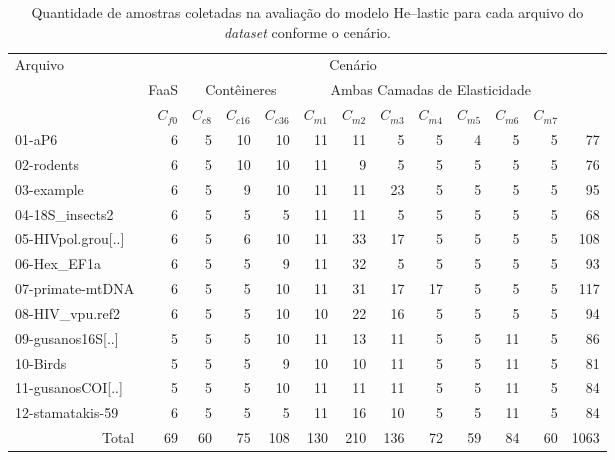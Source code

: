 \documentclass[english,brazilian]{UNISINOSmonografia} %
\newcommand\tabelaAngulo{90}
\begin{document}
\begin{table}[tbp]
	\centering%
	\begin{minipage}{\textwidth}
		\caption{Quantidade de amostras coletadas na avaliação do modelo \textsf{He}--lastic para cada arquivo do \textit{dataset} conforme o cenário.}
		\label{tab:results-modelo-samples}
		\vspace{1ex}
		\footnotesize
		\begin{tabular*}{\textwidth}{@{\extracolsep{\fill}}lrrrrrrrrrrrr@{}}
			\toprule
			\multirow[b]{3}{*}{Arquivo} & \multicolumn{11}{c}{Cenário} &
			\multirow[b]{3}{*}{\rotatebox[origin=c]{\tabelaAngulo}{\begin{tabular}[c]{@{}c@{}}Total\end{tabular}}} \\ \cmidrule(lr){2-12}
			& \multicolumn{1}{c}{FaaS} & \multicolumn{3}{c}{Contêineres} & \multicolumn{7}{c}{Ambas Camadas de Elasticidade} & \multicolumn{1}{c}{} \\ 
			\cmidrule(lr){2-2}
			\cmidrule(lr){3-5}
			\cmidrule(lr){6-12}
			& $C_{f0}$ & $C_{c8}$ & $C_{c16}$ & $C_{c36}$ & $C_{m1}$ & $C_{m2}$ & $C_{m3}$ & $C_{m4}$ & $C_{m5}$ & $C_{m6}$ & $C_{m7}$ & \multicolumn{1}{c}{} \\
			\midrule
			01-aP6 & 6 & 5 & 10 & 10 & 11 & 11 & 5 & 5 & 4 & 5 & 5 & 77 \\
			02-rodents & 6 & 5 & 10 & 10 & 11 & 9 & 5 & 5 & 5 & 5 & 5 & 76 \\
			03-example & 6 & 5 & 9 & 10 & 11 & 11 & 23 & 5 & 5 & 5 & 5 & 95 \\
			04-18S\_insects2 & 6 & 5 & 5 & 5 & 11 & 11 & 5 & 5 & 5 & 5 & 5 & 68 \\
			05-HIVpol.grou[..] & 6 & 5 & 6 & 10 & 11 & 33 & 17 & 5 & 5 & 5 & 5 & 108 \\
			06-Hex\_EF1a & 6 & 5 & 5 & 9 & 11 & 32 & 5 & 5 & 5 & 5 & 5 & 93 \\
			07-primate-mtDNA & 6 & 5 & 5 & 10 & 11 & 31 & 17 & 17 & 5 & 5 & 5 & 117 \\
			08-HIV\_vpu.ref2 & 6 & 5 & 5 & 10 & 10 & 22 & 16 & 5 & 5 & 5 & 5 & 94 \\
			09-gusanos16S[..] & 5 & 5 & 5 & 10 & 11 & 13 & 11 & 5 & 5 & 11 & 5 & 86 \\
			10-Birds & 5 & 5 & 5 & 9 & 10 & 10 & 11 & 5 & 5 & 11 & 5 & 81 \\
			11-gusanosCOI[..] & 5 & 5 & 5 & 10 & 11 & 11 & 11 & 5 & 5 & 11 & 5 & 84 \\
			12-stamatakis-59 & 6 & 5 & 5 & 5 & 11 & 16 & 10 & 5 & 5 & 11 & 5 & 84 \\
			\bottomrule
			\multicolumn{1}{r}{Total} & 69 & 60 & 75 & 108 & 130 & 210 & 136 & 72 & 59 & 84 & 60 & {\scriptsize 1063} \\ 
		\end{tabular*}
	\end{minipage}
\end{table}
\end{document}
